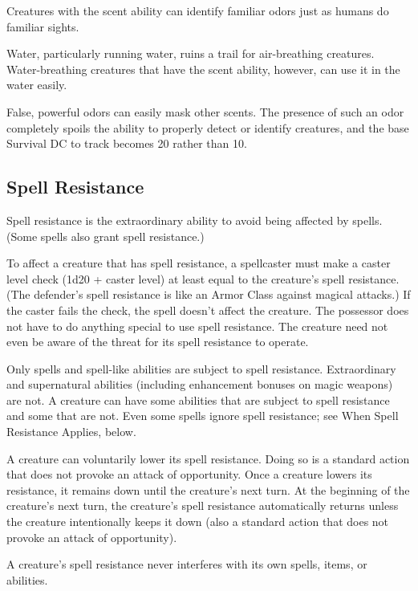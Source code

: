 Creatures with the scent ability can identify familiar odors just as humans do 
familiar sights.

Water, particularly running water, ruins a trail for air-breathing creatures. Water-breathing 
creatures that have the scent ability, however, can use it in the water easily.

False, powerful odors can easily mask other scents. The presence of such an odor 
completely spoils the ability to properly detect or identify creatures, and the 
base Survival DC to track becomes 20 rather than 10.

\subsection{Spell Resistance}

Spell resistance is the extraordinary ability to avoid being affected by spells. 
(Some spells also grant spell resistance.)

To affect a creature that has spell resistance, a spellcaster must make a caster 
level check (1d20 + caster level) at least equal to the creature's spell resistance. 
(The defender's spell resistance is like an Armor Class against magical attacks.) 
If the caster fails the check, the spell doesn't affect the creature. The possessor 
does not have to do anything special to use spell resistance. The creature need 
not even be aware of the threat for its spell resistance to operate.

Only spells and spell-like abilities are subject to spell resistance. Extraordinary 
and supernatural abilities (including enhancement bonuses on magic weapons) are 
not. A creature can have some abilities that are subject to spell resistance and 
some that are not. Even some spells ignore spell resistance; see When Spell Resistance 
Applies, below. 

A creature can voluntarily lower its spell resistance. Doing so is a standard action 
that does not provoke an attack of opportunity. Once a creature lowers its resistance, 
it remains down until the creature's next turn. At the beginning of the creature's 
next turn, the creature's spell resistance automatically returns unless the creature 
intentionally keeps it down (also a standard action that does not provoke an attack 
of opportunity).

A creature's spell resistance never interferes with its own spells, items, or abilities.

